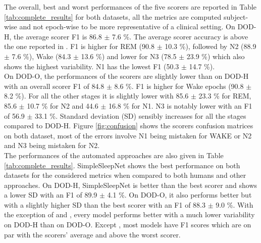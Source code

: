 \documentclass[journal]{IEEEtran}
\begin{document}
The overall, best and worst performances of the five scorers are reported in Table \ref{tab:complete_results} for both datasets, all the metrics are computed subject-wise and not epoch-wise to be more representative of a clinical setting. On DOD-H, the average scorer F1 is 86.8 $\pm$ 7.6 \%. The average scorer accuracy is above the one reported in \cite{Danker-Hopfe2009InterraterStandard}. F1 is higher for REM (90.8 $\pm$ 10.3 \%), followed by N2 (88.9 $\pm$ 7.6 \%), Wake (84.3 $\pm$ 13.6 \%) and lower for N3 (78.5 $\pm$ 23.9 \%) which also shows the highest variability. N1 has the lowest F1 (50.3 $\pm$ 14.7 \%).\\
On DOD-O, the performances of the scorers are slightly lower than on DOD-H with an overall scorer F1 of 84.8 $\pm$ 8.6 \%. F1 is higher for Wake epochs (90.8 $\pm$ 8.2 \%). For all the other stages it is slightly lower with 85.6 $\pm$ 23.3 \% for REM, 85.6 $\pm$ 10.7 \% for N2 and 44.6 $\pm$ 16.8 \% for N1. N3 is notably lower with an F1 of 56.9 $\pm$ 33.1 \%. Standard deviation (SD) sensibly increases for all the stages compared to DOD-H. Figure \ref{fig:confusion} shows the scorers confusion matrices on both dataset, most of the errors involve N1 being mistaken for WAKE or N2 and N3 being mistaken for N2.\\
The performances of the automated approaches are also given in Table \ref{tab:complete_results}. SimpleSleepNet shows the best performance on both datasets for the considered metrics when compared to both humans and other approaches. On DOD-H, SimpleSleepNet is better than the best scorer and shows a lower SD with an F1 of 89.9 $\pm$ 4.1 \%. On DOD-O, it also performs better but with a slightly higher SD than the best scorer with an F1 of 88.3 $\pm$ 9.0 \%. With the exception of \cite{Chambon2018} and \cite{Tsinalis2016a}, every model performs better  with a much lower variability on DOD-H than on DOD-O. Except \cite{Tsinalis2016a}, most models have F1 scores which are on par with the scorers' average and above the worst scorer.
\end{document}
